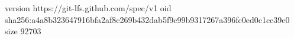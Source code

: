 version https://git-lfs.github.com/spec/v1
oid sha256:a4a8b323647916bfa2af8c269b432dab5f9c99b9317267a396fc0ed0c1cc39e0
size 92703
